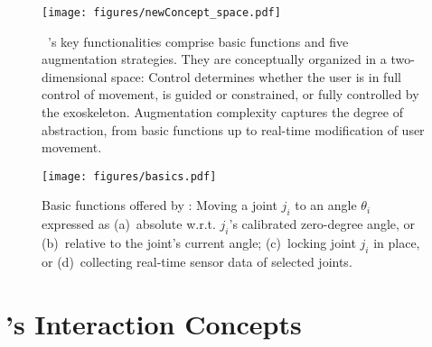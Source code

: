 \begin{figure}[b]
    \texttt{[image: figures/newConcept\_space.pdf]}
    \caption{~\toolkit's key functionalities comprise basic functions and five augmentation strategies. They are conceptually organized in a two-dimensional space: Control determines whether the user is in full control of movement, is guided or constrained, or fully controlled by the exoskeleton. Augmentation complexity captures the degree of abstraction, from basic functions up to real-time modification of user movement.}
    \label{fig:conceptual_space}
\end{figure}
\begin{figure*}[h]
    \centering
    \texttt{[image: figures/basics.pdf]}
    \caption{Basic functions offered by \toolkit: Moving a joint $j_i$ to an angle $\theta_i$ expressed as (a)~absolute w.r.t. $j_i$'s calibrated zero-degree angle, or (b)~relative to the joint's current angle; (c)~locking joint $j_i$ in place, or (d)~collecting real-time sensor data of selected joints.}
    \label{fig:move_to}
\end{figure*} 
\section{\toolkit's Interaction Concepts}\label{sec:concepts}

